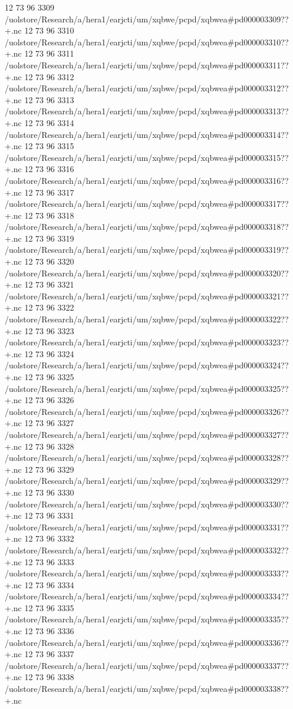 12 73 96
3309
/uolstore/Research/a/hera1/earjcti/um/xqbwe/pcpd/xqbwea#pd000003309??+.nc
12 73 96
3310
/uolstore/Research/a/hera1/earjcti/um/xqbwe/pcpd/xqbwea#pd000003310??+.nc
12 73 96
3311
/uolstore/Research/a/hera1/earjcti/um/xqbwe/pcpd/xqbwea#pd000003311??+.nc
12 73 96
3312
/uolstore/Research/a/hera1/earjcti/um/xqbwe/pcpd/xqbwea#pd000003312??+.nc
12 73 96
3313
/uolstore/Research/a/hera1/earjcti/um/xqbwe/pcpd/xqbwea#pd000003313??+.nc
12 73 96
3314
/uolstore/Research/a/hera1/earjcti/um/xqbwe/pcpd/xqbwea#pd000003314??+.nc
12 73 96
3315
/uolstore/Research/a/hera1/earjcti/um/xqbwe/pcpd/xqbwea#pd000003315??+.nc
12 73 96
3316
/uolstore/Research/a/hera1/earjcti/um/xqbwe/pcpd/xqbwea#pd000003316??+.nc
12 73 96
3317
/uolstore/Research/a/hera1/earjcti/um/xqbwe/pcpd/xqbwea#pd000003317??+.nc
12 73 96
3318
/uolstore/Research/a/hera1/earjcti/um/xqbwe/pcpd/xqbwea#pd000003318??+.nc
12 73 96
3319
/uolstore/Research/a/hera1/earjcti/um/xqbwe/pcpd/xqbwea#pd000003319??+.nc
12 73 96
3320
/uolstore/Research/a/hera1/earjcti/um/xqbwe/pcpd/xqbwea#pd000003320??+.nc
12 73 96
3321
/uolstore/Research/a/hera1/earjcti/um/xqbwe/pcpd/xqbwea#pd000003321??+.nc
12 73 96
3322
/uolstore/Research/a/hera1/earjcti/um/xqbwe/pcpd/xqbwea#pd000003322??+.nc
12 73 96
3323
/uolstore/Research/a/hera1/earjcti/um/xqbwe/pcpd/xqbwea#pd000003323??+.nc
12 73 96
3324
/uolstore/Research/a/hera1/earjcti/um/xqbwe/pcpd/xqbwea#pd000003324??+.nc
12 73 96
3325
/uolstore/Research/a/hera1/earjcti/um/xqbwe/pcpd/xqbwea#pd000003325??+.nc
12 73 96
3326
/uolstore/Research/a/hera1/earjcti/um/xqbwe/pcpd/xqbwea#pd000003326??+.nc
12 73 96
3327
/uolstore/Research/a/hera1/earjcti/um/xqbwe/pcpd/xqbwea#pd000003327??+.nc
12 73 96
3328
/uolstore/Research/a/hera1/earjcti/um/xqbwe/pcpd/xqbwea#pd000003328??+.nc
12 73 96
3329
/uolstore/Research/a/hera1/earjcti/um/xqbwe/pcpd/xqbwea#pd000003329??+.nc
12 73 96
3330
/uolstore/Research/a/hera1/earjcti/um/xqbwe/pcpd/xqbwea#pd000003330??+.nc
12 73 96
3331
/uolstore/Research/a/hera1/earjcti/um/xqbwe/pcpd/xqbwea#pd000003331??+.nc
12 73 96
3332
/uolstore/Research/a/hera1/earjcti/um/xqbwe/pcpd/xqbwea#pd000003332??+.nc
12 73 96
3333
/uolstore/Research/a/hera1/earjcti/um/xqbwe/pcpd/xqbwea#pd000003333??+.nc
12 73 96
3334
/uolstore/Research/a/hera1/earjcti/um/xqbwe/pcpd/xqbwea#pd000003334??+.nc
12 73 96
3335
/uolstore/Research/a/hera1/earjcti/um/xqbwe/pcpd/xqbwea#pd000003335??+.nc
12 73 96
3336
/uolstore/Research/a/hera1/earjcti/um/xqbwe/pcpd/xqbwea#pd000003336??+.nc
12 73 96
3337
/uolstore/Research/a/hera1/earjcti/um/xqbwe/pcpd/xqbwea#pd000003337??+.nc
12 73 96
3338
/uolstore/Research/a/hera1/earjcti/um/xqbwe/pcpd/xqbwea#pd000003338??+.nc
